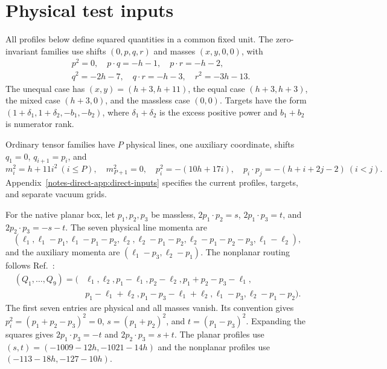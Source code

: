 \documentclass[11pt,a4paper]{article}
\begin{document}
\section{Physical test inputs}
\label{notes-direct-app:families-new}
All profiles below define squared quantities in a common fixed unit. The zero-invariant families use shifts $(0,p,q,r)$ and masses $(x,y,0,0)$, with
\begin{align}
 &p^2=0,\quad p\cdot q=-h-1,\quad p\cdot r=-h-2,\nonumber\\
 &q^2=-2h-7,\quad q\cdot r=-h-3,\quad r^2=-3h-13.
 \label{notes-direct-eq:light-input}
\end{align}
The unequal case has $(x,y)=(h+3,h+11)$, the equal case $(h+3,h+3)$, the mixed case $(h+3,0)$, and the massless case $(0,0)$. Targets have the form $(1+\delta_1,1+\delta_2,-b_1,-b_2)$, where $\delta_1+\delta_2$ is the excess positive power and $b_1+b_2$ is numerator rank.

Ordinary tensor families have $P$ physical lines, one auxiliary coordinate, shifts $q_1=0$, $q_{i+1}=p_i$, and
\begin{equation}
 m_i^2=h+11i^2\ (i\leq P),\quad m_{P+1}^2=0,\quad
 p_i^2=-(10h+17i),\quad p_i\cdot p_j=-(h+i+2j-2)\ (i<j).
 \label{notes-direct-eq:ordinary-input}
\end{equation}
Appendix~\ref{notes-direct-app:direct-inputs} specifies the current profiles, targets, and separate vacuum grids.

For the native planar box, let $p_1,p_2,p_3$ be massless, $2p_1\cdot p_2=s$, $2p_1\cdot p_3=t$, and $2p_2\cdot p_3=-s-t$. The seven physical line momenta are
\begin{equation}
 (\ell_1,\ell_1-p_1,\ell_1-p_1-p_2,\ell_2,
 \ell_2-p_1-p_2,\ell_2-p_1-p_2-p_3,\ell_1-\ell_2),
 \label{notes-direct-eq:planar-input}
\end{equation}
and the auxiliary momenta are $(\ell_1-p_3,\ell_2-p_1)$. The nonplanar routing follows Ref.~\cite{KiraOriginal}:
\begin{align}
 (Q_1,\ldots,Q_9)=(&\ell_1,\ell_2,p_1-\ell_1,p_2-\ell_2,
 p_1+p_2-p_3-\ell_1,\nonumber\\
 &p_1-\ell_1+\ell_2,p_1-p_3-\ell_1+\ell_2,
 \ell_1-p_3,\ell_2-p_1-p_2).
 \label{notes-direct-eq:nonplanar-input}
\end{align}
The first seven entries are physical and all masses vanish. Its convention gives $p_i^2=(p_1+p_2-p_3)^2=0$, $s=(p_1+p_2)^2$, and $t=(p_1-p_3)^2$. Expanding the squares gives $2p_1\cdot p_3=-t$ and $2p_2\cdot p_3=s+t$. The planar profiles use $(s,t)=(-1009-12h,-1021-14h)$ and the nonplanar profiles use $(-113-18h,-127-10h)$.
\end{document}
